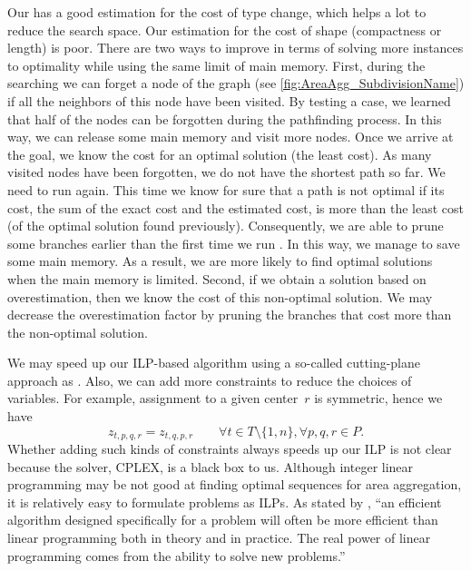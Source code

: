 Our \Astar has a good estimation for the cost of type 
change, which helps a lot to reduce the search space. 
Our estimation for the cost of shape 
(compactness or length) is poor.
There are two ways to improve \Astar
in terms of solving more instances to optimality 
while using the same limit of main memory.
First, during the searching we can forget a node of the graph
(see \fig\ref{fig:AreaAgg_SubdivisionName})
if all the neighbors of this node have been visited.
By testing a case, we learned that half of the nodes can be 
forgotten during the pathfinding process.
In this way, we can release some main memory 
and visit more nodes.
Once we arrive at the goal, 
we know the cost for 
an optimal solution (the least cost).
As many visited nodes have been forgotten, 
we do not have the shortest path so far.
We need to run \Astar again.
This time we know for sure that 
a path is not optimal if its cost, 
the sum of the exact cost and the estimated cost, 
is more than the least cost 
(of the optimal solution found previously).
Consequently, we are able to prune some branches earlier 
than the first time we run \Astar.
In this way, we manage to save some main memory.
As a result, we are more likely to find optimal solutions
when the main memory is limited.
Second, if we obtain a solution based on overestimation, 
then we know the cost of this non-optimal solution.
We may decrease the overestimation factor by pruning the branches
that cost more than the non-optimal solution.


We may speed up our ILP-based algorithm using a so-called 
cutting-plane approach as \textcite{Oehrlein2017Aggregation}.
Also, we can add more constraints to
reduce the choices of variables.
For example, assignment to a given center~$r$ is symmetric, 
hence we have
\begin{equation*}
\label{eq:CstrZX}
z_{t,p,q,r}= z_{t,q,p,r} \qquad
\forall t \in {T} \setminus \{1,n\}, 
\forall p, q, r \in P.
\end{equation*}
Whether adding such kinds of constraints always
speeds up our ILP is not clear
because the solver, CPLEX, is a black box to us.
Although integer linear programming may be not good at 
finding optimal sequences for area aggregation,
it is relatively easy to formulate problems as ILPs.
As stated by \citet[p.~861]{Cormen2009}, 
``an efficient algorithm designed specifically for a problem 
will often be more efficient than 
linear programming both in theory and in practice. 
The real power of linear programming comes from 
the ability to solve new problems.''

